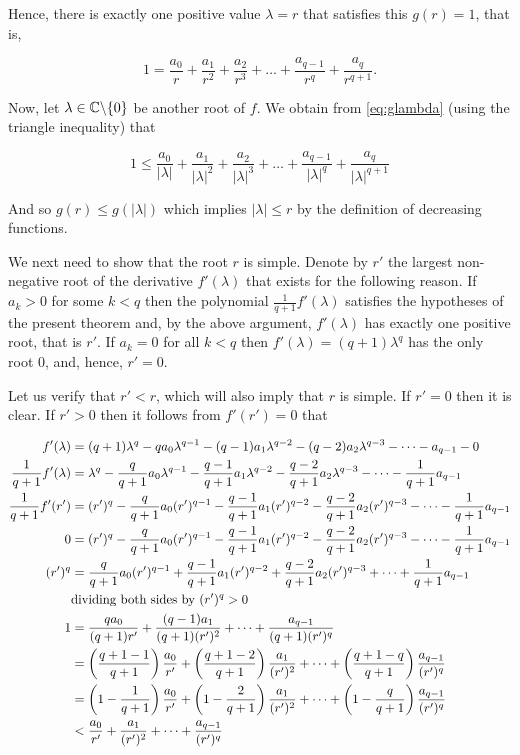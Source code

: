 \begin{theorem}
\begin{pf}
\begin{enumerate}[(a)]
Hence, there is exactly one positive value $\lambda = r$ that satisfies this $g(r) = 1$, that is,

$$1 =\frac{a_0}{r} + \frac{a_1}{r^2} + \frac{a_2}{r^3}+\dots + \frac{a_{q-1}}{r^q} +\frac{a_q}{r^{q+1}}.$$

Now, let $\lambda\in \mathbb C \backslash \{0\}$ be another root of $f$. We obtain from \ref{eq:glambda} (using the triangle inequality) that

$$1\leq \frac{a_0}{|\lambda|} + \frac{a_1}{|\lambda|^2} + \frac{a_2}{|\lambda|^3}+\dots + \frac{a_{q-1}}{|\lambda|^q} +\frac{a_q}{|\lambda|^{q+1}}$$

And so $g(r)\leq g(|\lambda|)$ which implies $|\lambda|\leq r$ by the definition of decreasing functions.

We next need to show that the root $r$ is simple. Denote by $r'$ the largest non-negative root of the
derivative $f'(\lambda)$ that exists for the following reason. If $a_k > 0$ for some $k < q$ then the
polynomial $\frac{1}{q+1} f'(\lambda)$ satisfies the hypotheses of the present theorem and, by the above
argument, $f'(\lambda)$ has exactly one positive root, that is $r'$. If $a_k = 0$ for all $k < q$ then
$f'(\lambda) = (q + 1) \lambda^q$ has the only root $0$, and, hence, $r' = 0$. 

Let us verify that $r' < r$, which will also imply that $r$ is simple. If $r' = 0$ then it is clear. If $r' > 0$ then it follows
from $f'(r') = 0$ that

$\begin{aligned}
f'(\lambda) &=(q+1)\lambda^q -qa_0\lambda^{q-1} -(q-1)a_1\lambda^{q-2} -(q-2)a_2\lambda^{q-3} -\cdots - a_{q-1}-0\\
\frac{1}{q+1}f'(\lambda) &=\lambda^q -\frac{q}{q+1}a_0\lambda^{q-1} -\frac{q-1}{q+1}a_1\lambda^{q-2} -\frac{q-2}{q+1}a_2\lambda^{q-3} -\cdots - \frac{1}{q+1}a_{q-1}\\
\frac{1}{q+1}f'(r') &=(r')^q -\frac{q}{q+1}a_0(r')^{q-1} -\frac{q-1}{q+1}a_1(r')^{q-2} -\frac{q-2}{q+1}a_2(r')^{q-3} -\cdots - \frac{1}{q+1}a_{q-1}\\
0 &=(r')^q -\frac{q}{q+1}a_0(r')^{q-1} -\frac{q-1}{q+1}a_1(r')^{q-2} -\frac{q-2}{q+1}a_2(r')^{q-3} -\cdots - \frac{1}{q+1}a_{q-1}\\
(r')^q &=\frac{q}{q+1}a_0(r')^{q-1} +\frac{q-1}{q+1}a_1(r')^{q-2} +\frac{q-2}{q+1}a_2(r')^{q-3} +\cdots + \frac{1}{q+1}a_{q-1}\\
& \text{dividing both sides by } (r')^q>0 \\
1 &= \frac{qa_0}{(q+1)r'} +\frac{(q-1)a_1}{(q+1)(r')^2} +\dots+\frac{a_{q-1}}{(q+1)(r')^q} \\
  &= \left(\frac{q+1-1}{q+1}\right)\frac{a_0}{r'} +
     \left(\frac{q+1-2}{q+1}\right)\frac{a_1}{(r')^2} +\dots+
     \left(\frac{q+1-q}{q+1}\right)\frac{a_{q-1}}{(r')^q}\\
  &= \left(1-\frac{1}{q+1}\right)\frac{a_0}{r'} +
     \left(1-\frac{2}{q+1}\right)\frac{a_1}{(r')^2} +\dots+
     \left(1-\frac{q}{q+1}\right)\frac{a_{q-1}}{(r')^q}\\
  &< \frac{a_0}{r'} +\frac{a_1}{(r')^2} +\dots+\frac{a_{q-1}}{(r')^q}
\end{aligned}$


\end{enumerate}
\end{pf}
\end{theorem}

